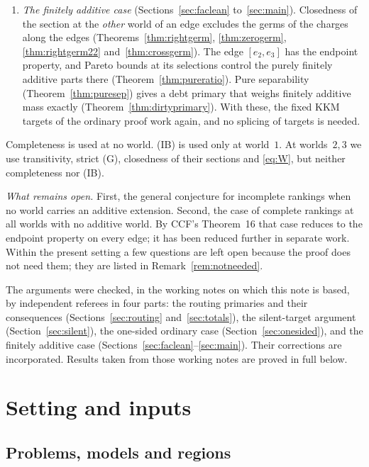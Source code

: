 \documentclass[11pt]{article}
\theoremstyle{definition}\newtheorem{definition}[theorem]{Definition}
\theoremstyle{remark}\newtheorem{remark}[theorem]{Remark}
\begin{document}
\begin{enumerate}[leftmargin=*,itemsep=3pt]
model weakly better at every world, given by (K1), the KKM-type lemma of
CBOI; Section~\ref{sec:setting}) then yields a pure
trade of debt for credit at a ratio that the forced trades of the edge
selections forbid.
\item \emph{The finitely additive case} (Sections~\ref{sec:faclean}
to~\ref{sec:main}). Closedness of the section at the \emph{other} world of an
edge excludes the germs of the charges along the edges
(Theorems~\ref{thm:rightgerm}, \ref{thm:zerogerm}, \ref{thm:rightgerm22}
and~\ref{thm:crossgerm}). The edge $[e_2,e_3]$
has the endpoint property, and Pareto bounds at its selections control the
purely finitely additive parts there (Theorem~\ref{thm:pureratio}). Pure
separability (Theorem~\ref{thm:puresep}) gives a debt primary that weighs
finitely additive mass exactly (Theorem~\ref{thm:dirtyprimary}). With these,
the fixed KKM targets of the ordinary proof work again, and no splicing of
targets is needed.
\end{enumerate}
Completeness is used at no world. (IB) is used only at world~$1$. At
worlds~$2,3$ we use transitivity, strict (G), closedness of their sections
and \eqref{eq:W}, but neither completeness nor (IB).

\emph{What remains open.} First, the general conjecture for incomplete
rankings when no world carries an additive extension. Second, the case of
complete rankings at all worlds with no additive world. By CCF's
Theorem~16 that case reduces to the endpoint property on every edge; it has
been reduced further in separate work. Within the present setting a few
questions are left open because the proof does not need them; they are
listed in Remark~\ref{rem:notneeded}.

The arguments were checked, in the working notes on which this note is
based, by independent referees in four parts: the routing primaries and their
consequences (Sections~\ref{sec:routing} and~\ref{sec:totals}), the
silent-target argument (Section~\ref{sec:silent}), the one-sided ordinary
case (Section~\ref{sec:onesided}), and the finitely additive case
(Sections~\ref{sec:faclean}--\ref{sec:main}). Their corrections are
incorporated. Results taken from those working notes are proved in full
below.

\section{Setting and inputs}\label{sec:setting}

\subsection{Problems, models and regions}
\end{document}
